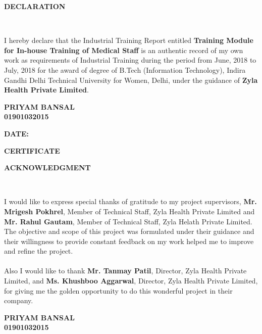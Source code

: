 \documentclass[a4paper,11pt]{article}
\begin{document}
\newpage
{}
\setcounter{page}{1}
{\LARGE \bfseries DECLARATION}
\vspace*{5mm}
\medskip\\
\begin{spacing}{1.5}
I hereby declare that the Industrial Training Report entitled \textbf{Training Module for In-house Training of Medical Staff} is an authentic record of my own work as requirements of Industrial Training during the period from June, 2018 to July, 2018 for the award of degree of B.Tech (Information Technology), Indira Gandhi Delhi Technical University for Women, Delhi, under the guidance of \textbf{Zyla Health Private Limited}.\medskip\\
\begin{flushright}
{\textbf{PRIYAM BANSAL\\
01901032015\\}}
\end{flushright}
{\textbf{DATE:}}
\end{spacing}

\newpage
{\LARGE \bfseries CERTIFICATE}
\vspace*{5mm}


\newpage
{\LARGE \bfseries ACKNOWLEDGMENT}
\vspace*{5mm}
\medskip\\
 \begin{spacing}{1.5}
    I would like to express special thanks of gratitude to my project supervisors, \textbf{Mr. Mrigesh Pokhrel}, Member of Technical Staff, Zyla Health Private Limited and \textbf{Mr. Rahul Gautam}, Member of Technical Staff, Zyla Helath Private Limited. The objective and scope of this project was
    formulated under their guidance and their willingness to
    provide constant feedback on my work helped me to
    improve and refine the project. \\
    \\
    Also I would like to thank \textbf{Mr. Tanmay Patil}, Director, Zyla Health Private Limited, and \textbf{Ms. Khushboo Aggarwal}, Director, Zyla Health Private Limited, for giving me the golden opportunity to do this wonderful project in their company. 
    
  \vspace*{2.5cm}
{\hspace*{\fill} {\textbf{PRIYAM BANSAL\\\hspace*{\fill}01901032015}}}
\end{spacing}
\end{document}
